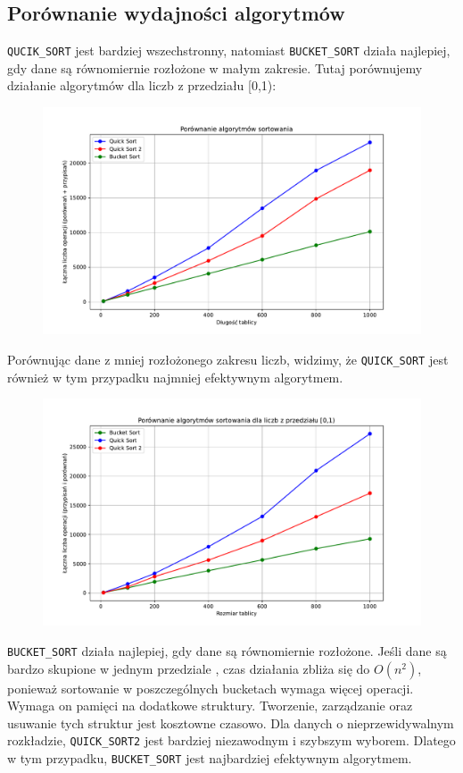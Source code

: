 \documentclass{article}
\begin{document}
\subsection{Porównanie wydajności algorytmów}
\texttt{QUCIK\_SORT} jest bardziej wszechstronny, natomiast \texttt{BUCKET\_SORT} działa najlepiej, gdy dane są równomiernie rozłożone w małym zakresie.
 Tutaj porównujemy działanie algorytmów dla liczb z przedziału [0,1):
\begin{figure}[H]
	\centering
	\includegraphics[width=1\textwidth]{wykres1.pdf}
\end{figure}
 Porównując dane z mniej rozłożonego zakresu liczb, widzimy, że \texttt{QUICK\_SORT} jest również w tym przypadku najmniej efektywnym algorytmem.  
 \begin{figure}[H]
 	\centering
 	\includegraphics[width=1\textwidth]{wykres.3.pdf}
 \end{figure}
 
\texttt{BUCKET\_SORT} działa najlepiej, gdy dane są równomiernie rozłożone. Jeśli dane są bardzo skupione w jednym przedziale , czas działania zbliża się do  \(O(n^2)\), ponieważ sortowanie w poszczególnych bucketach wymaga więcej operacji. Wymaga on pamięci na dodatkowe struktury. Tworzenie, zarządzanie oraz usuwanie tych struktur jest kosztowne czasowo. Dla danych o nieprzewidywalnym rozkładzie, \texttt{QUICK\_SORT2}  jest bardziej niezawodnym i szybszym wyborem. Dlatego w tym przypadku, \texttt{BUCKET\_SORT} jest najbardziej efektywnym algorytmem.
	
	
\end{document}
